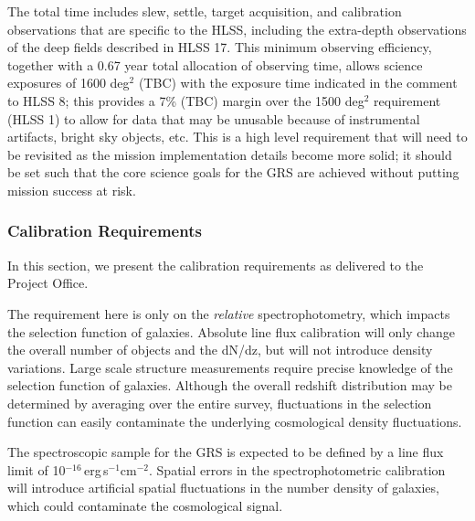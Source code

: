 
 The total time includes slew, settle, target acquisition, and
 calibration observations that are specific to the HLSS, including the
 extra-depth observations of the deep fields described in HLSS 17.  This minimum
 observing efficiency, together with a 0.67 year total allocation of observing
 time, allows science exposures of 1600 deg$^2$ (TBC) with the exposure time
 indicated in the comment to HLSS 8; this provides a 7\% (TBC) margin over the
 1500 deg$^2$ requirement (HLSS 1) to allow for data that may be unusable because of
 instrumental artifacts, bright sky objects, etc. This is a high level
 requirement that will need to be revisited as the mission implementation details
 become more solid; it should be set such that the core science goals for the GRS
 are achieved without putting mission success at risk.


\subsubsection{Calibration Requirements} In this section, we present the calibration requirements as delivered to the Project Office.


 The requirement here is only on the {\it relative} spectrophotometry, which impacts the selection function of galaxies. Absolute line flux calibration will only change the overall number of objects and the dN/dz, but will not introduce
 density variations.  Large scale structure measurements require precise
 knowledge of the selection function of galaxies. Although the overall redshift
 distribution may be determined by averaging over the entire survey, fluctuations
 in the selection function can easily contaminate the underlying cosmological
 density fluctuations.

 The spectroscopic sample for the GRS is expected to be defined by a line flux
 limit of 10$^{-16}\,$erg$\,$s$^{-1}$cm$^{-2}$. Spatial errors in the spectrophotometric calibration
 will introduce artificial spatial fluctuations in the number density of
 galaxies, which could contaminate the cosmological signal.


